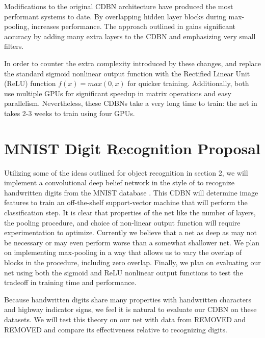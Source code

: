 \documentclass[10pt,twocolumn,letterpaper]{article}
\begin{document}
Modifications to the original CDBN architecture \cite{CDBN} have produced the most performant
systems to date.
By overlapping hidden layer blocks during max-pooling, \cite{ImageNet} increases performance.
The approach outlined in \cite{Verydeep} gains significant accuracy by adding many extra layers
to the CDBN and emphasizing very small filters.

In order to counter the extra complexity introduced by these changes,
\cite{ImageNet} and \cite{Verydeep} replace the standard sigmoid nonlinear output function with the
Rectified Linear Unit (ReLU) function \(f(x) = max(0, x) \) for quicker training.
Additionally, both use multiple GPUs for significant speedup in matrix operations
and easy parallelism.
Nevertheless, these CDBNs take a very long time to train: the net in \cite{Verydeep}
takes 2-3 weeks to train using four GPUs.

\section{MNIST Digit Recognition Proposal}

Utilizing some of the ideas outlined for object recognition in section 2,
we will implement a convolutional deep belief network in the style of \cite{CDBN} to recognize
handwritten digits from the MNIST database \cite{MNIST}.
This CDBN will determine image features to train an off-the-shelf support-vector machine
that will perform the classification step.
It is clear that properties of the net like the number of layers, the pooling procedure,
and choice of non-linear output function will require experimentation to optimize.
Currently we believe that a net as deep as \cite{Verydeep} may not be necessary or may even perform worse than a
somewhat shallower net.
We plan on implementing max-pooling in a way that allows us to vary the overlap of blocks in the
procedure, including zero overlap.
Finally, we plan on evaluating our net using both the sigmoid and ReLU nonlinear
output functions to test the tradeoff in training time and performance.

Because handwritten digits share many properties with handwritten characters
and highway indicator signs, we feel it is natural to evaluate our CDBN on these datasets.
We will test this theory on our net with data from REMOVED and REMOVED
and compare its effectiveness relative to recognizing digits.

{\small


}
\end{document}
